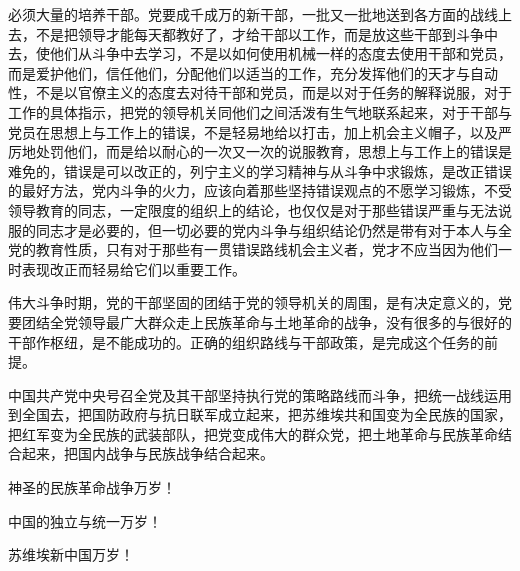 必须大量的培养干部。党要成千成万的新干部，一批又一批地送到各方面的战线上去，不是把领导才能每天都教好了，才给干部以工作，而是放这些干部到斗争中去，使他们从斗争中去学习，不是以如何使用机械一样的态度去使用干部和党员，而是爱护他们，信任他们，分配他们以适当的工作，充分发挥他们的天才与自动性，不是以官僚主义的态度去对待干部和党员，而是以对于任务的解释说服，对于工作的具体指示，把党的领导机关同他们之间活泼有生气地联系起来，对于干部与党员在思想上与工作上的错误，不是轻易地给以打击，加上机会主义帽子，以及严厉地处罚他们，而是给以耐心的一次又一次的说服教育，思想上与工作上的错误是难免的，错误是可以改正的，列宁主义的学习精神与从斗争中求锻炼，是改正错误的最好方法，党内斗争的火力，应该向着那些坚持错误观点的不愿学习锻炼，不受领导教育的同志，一定限度的组织上的结论，也仅仅是对于那些错误严重与无法说服的同志才是必要的，但一切必要的党内斗争与组织结论仍然是带有对于本人与全党的教育性质，只有对于那些有一贯错误路线机会主义者，党才不应当因为他们一时表现改正而轻易给它们以重要工作。

伟大斗争时期，党的干部坚固的团结于党的领导机关的周围，是有决定意义的，党要团结全党领导最广大群众走上民族革命与土地革命的战争，没有很多的与很好的干部作枢纽，是不能成功的。正确的组织路线与干部政策，是完成这个任务的前提。

中国共产党中央号召全党及其干部坚持执行党的策略路线而斗争，把统一战线运用到全国去，把国防政府与抗日联军成立起来，把苏维埃共和国变为全民族的国家，把红军变为全民族的武装部队，把党变成伟大的群众党，把土地革命与民族革命结合起来，把国内战争与民族战争结合起来。

神圣的民族革命战争万岁！

中国的独立与统一万岁！

苏维埃新中国万岁！

